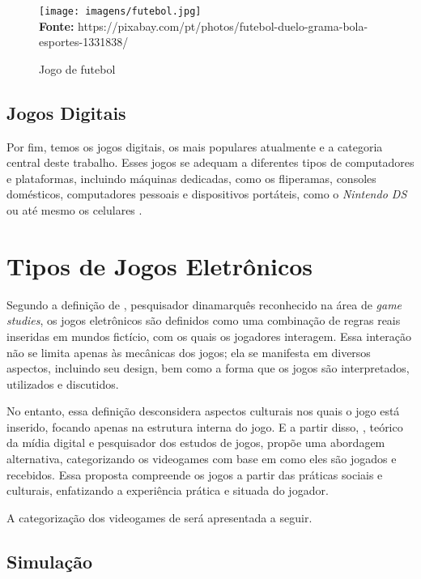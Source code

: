 \FloatBarrier 
\begin{figure}[!htbp]
	\centering
	\caption{Jogo de futebol}
	\texttt{[image: imagens/futebol.jpg]}
	\\\textbf{Fonte:} https://pixabay.com/pt/photos/futebol-duelo-grama-bola-esportes-1331838/
	\label{fig:futebol}
\end{figure}
\FloatBarrier



\subsection{Jogos Digitais}


Por fim, temos os jogos digitais, os mais populares atualmente e a categoria central deste trabalho. Esses jogos se adequam a diferentes tipos de computadores e plataformas, incluindo máquinas dedicadas, como os fliperamas, consoles domésticos, computadores pessoais e dispositivos portáteis, como o \textit{Nintendo DS} ou até mesmo os celulares \cite{Crawford1997}.


\section{Tipos de Jogos Eletrônicos}

Segundo a definição de , pesquisador dinamarquês reconhecido na área de \textit{game studies}, os jogos eletrônicos são definidos como uma combinação de regras reais inseridas em mundos fictício, com os quais os jogadores interagem. Essa interação não se limita apenas às mecânicas dos jogos; ela se manifesta em diversos aspectos, incluindo seu design, bem como a forma que os jogos são interpretados, utilizados e discutidos.

No entanto, essa definição desconsidera aspectos culturais nos quais o jogo está inserido, focando apenas na estrutura interna do jogo. E a partir disso, , teórico da mídia digital e pesquisador dos estudos de jogos, propõe uma abordagem alternativa, categorizando os videogames com base em como eles são jogados e recebidos. Essa proposta compreende os jogos a partir das práticas sociais e culturais, enfatizando a experiência prática e situada do jogador.

A categorização dos videogames de  será apresentada a seguir.


\subsection{Simulação}


